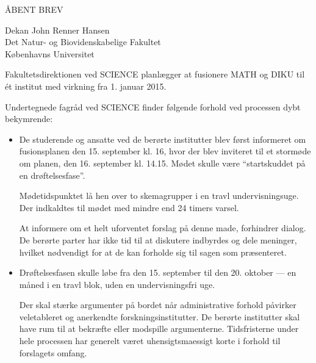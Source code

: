\documentclass[a4paper]{article}
\begin{document}
ÅBENT BREV

Dekan John Renner Hansen \\
Det Natur- og Biovidenskabelige Fakultet \\
Københavns Universitet

Fakultetsdirektionen ved SCIENCE planlægger at fusionere MATH og DIKU til ét
institut med virkning fra 1. januar 2015.

Undertegnede fagråd ved \mbox{SCIENCE} finder følgende forhold ved processen
dybt bekymrende:

\begin{itemize}

\item De studerende og ansatte ved de berørte institutter blev først informeret
om fusionsplanen den 15. september kl. 16, hvor der blev inviteret til et stormøde
om planen, den 16. september kl. 14.15. Mødet skulle være ``startskuddet på en
drøftelsesfase''\cite{invite}.

Mødetidspunktet lå hen over to skemagrupper i en travl undervisningsuge.  Der
indkaldtes til mødet med mindre end 24 timers varsel.

At informere om et helt uforventet forslag på denne made, forhindrer dialog. De
berørte parter har ikke tid til at diskutere indbyrdes og dele meninger,
hvilket nødvendigt for at de kan forholde sig til sagen som præsenteret.

\item Drøftelsesfasen skulle løbe fra den 15. september til den 20. oktober ---
en måned i en travl blok, uden en undervisningsfri uge.




Der skal stærke argumenter på bordet når administrative forhold påvirker
veletableret og anerkendte forskningsinstitutter. De berørte institutter skal
have rum til at bekræfte eller modspille argumenterne.  Tidsfristerne under
hele processen har generelt været uhensigtsmaessigt korte i forhold til
forslagets omfang.



\end{itemize}
\end{document}

